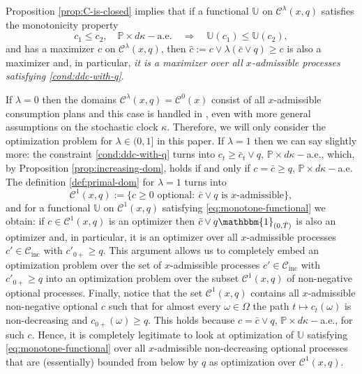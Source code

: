 \documentclass[11pt, oneside]{article}   	%
\theoremstyle{plain}
\theoremstyle{definition}
\theoremstyle{remark}
\begin{document}
Proposition \ref{prop:C-is-closed} implies that if a functional $\mathbb{U}$ on $\mathcal{C}^\lambda(x,q)$ satisfies the monotonicity property
\begin{equation}\label{eq:monotone-functional}
c_1\leq c_2,\quad \mathbb{P}\times d\kappa-\text{a.e.}\quad \Rightarrow\quad \mathbb{U}(c_1)\leq\mathbb{U}(c_2),
\end{equation}
and has a maximizer $c$ on $\mathcal{C}^\lambda(x,q)$, then $\hat{c}:=c\vee \lambda(\bar{c}\vee q)\geq c$ is also a maximizer and, in particular, \textit{it is a maximizer over all $x$-admissible processes satisfying \eqref{cond:ddc-with-q}}.

If $\lambda=0$ then the domains $\mathcal{C}^\lambda(x,q)=\mathcal{C}^0(x)$ consist of all $x$-admissible consumption plans and this case is handled in \cite{mostovyi}, even with more general assumptions on the stochastic clock $\kappa$. Therefore, we will only consider the optimization problem for $\lambda\in(0,1]$ in this paper. If $\lambda=1$ then we can say slightly more: the constraint \eqref{cond:ddc-with-q} turns into $c_t\geq \bar{c}_t\vee q$, $\mathbb{P}\times d\kappa-$a.e., which, by Proposition \ref{prop:increasing-dom}, holds if and only if $c=\bar{c}\geq q$, $\mathbb{P}\times d\kappa-$a.e. The definition \eqref{def:primal-dom} for $\lambda=1$ turns into
$$\mathcal{C}^1(x,q):=\{c\geq 0\text{ optional}:\ \bar{c}\vee q \text{ is } x\text{-admissible} \},$$
and for a functional $\mathbb{U}$ on $\mathcal{C}^1(x,q)$ satisfying \eqref{eq:monotone-functional} we obtain: if $c\in\mathcal{C}^1(x,q)$ is an optimizer then $\bar{c}\vee q\mathbbm{1}_{(0,\hat{T})}$ is also an optimizer and, in particular, it is an optimizer over all $x$-admissible processes $c'\in\mathcal{C}_{\text{inc}}$ with $c'_{0+}\geq q$. This argument allows us to completely embed an optimization problem over the set of $x$-admissible processes $c'\in\mathcal{C}_{\text{inc}}$ with $c'_{0+}\geq q$ into an optimization problem over the subset $\mathcal{C}^1(x,q)$ of non-negative optional processes. Finally, notice that the set $\mathcal{C}^1(x,q)$ contains all $x$-admissible non-negative optional $c$ such that for almost every $\omega\in\Omega$ the path $t\mapsto c_t(\omega)$ is non-decreasing and $c_{0+}(\omega)\geq q$. This holds because $c=\bar{c}\vee q$, $\mathbb{P}\times d\kappa-$a.e., for such $c$. Hence, it is completely legitimate to look at optimization of $\mathbb{U}$ satisfying \eqref{eq:monotone-functional} over all $x$-admissible non-decreasing optional processes that are (essentially) bounded from below by $q$ as optimization over $\mathcal{C}^1(x,q)$.
\end{document}
